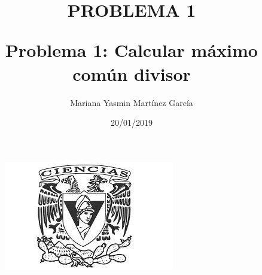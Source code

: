 \documentclass{article}
\title{\Huge\item\color{orange}\textbf{PROBLEMA 1 }}
\author{\Large Mariana Yasmin Martínez García}
\date{\Large 20/01/2019}
\begin{document}
\begin{figure}[t]
	\centering
	\includegraphics[width=0.7\linewidth]{../Imagenes/1}
	\caption{}
	\label{figura:1}
\end{figure}


	\maketitle
		
	\newpage
	
	\title{\huge\textbf{Problema 1: Calcular máximo común divisor }} \\
\end{document}
